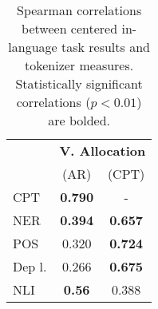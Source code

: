 \begin{table}
\centering

\begin{tabular}{lcc}
\toprule
 & \multicolumn{2}{c}{\bf{V. Allocation}} \\
 & (AR) &  (CPT) \\
\midrule
CPT    &    \bf{0.790} &     - \\
NER    &   \bf{0.394} &   \bf{0.657}  \\
POS    &     0.320 &   \bf{0.724} \\
Dep l. &     0.266 &   \bf{0.675} \\
NLI   &    \bf{0.56} &    0.388 \\ 
\bottomrule
\end{tabular}
\caption{Spearman correlations between centered in-language task results and tokenizer measures. Statistically significant correlations ($p<0.01$) are bolded. }
\label{tab:corr_in_lang_20l}
\end{table}